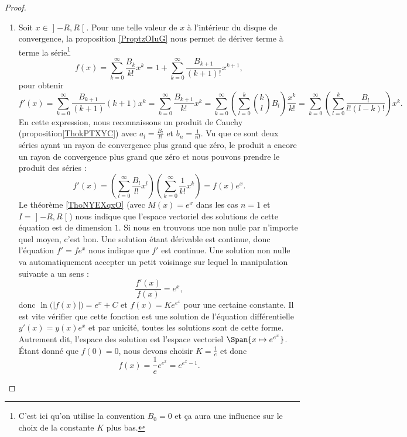 \begin{proof}
\begin{enumerate}
        \item

            Soit \( x\in\mathopen] -R , R \mathclose[\). Pour une telle valeur de \( x\) à l'intérieur du disque de convergence, la proposition \ref{ProptzOIuG} nous permet de dériver terme à terme la série\footnote{C'est ici qu'on utilise la convention \( B_0=0\) et ça aura une influence sur le choix de la constante \( K\) plus bas.}
                \begin{equation}
                    f(x)=\sum_{k=0}^{\infty}\frac{ B_k }{ k! }x^k=1+\sum_{k=0}^{\infty}\frac{ B_{k+1} }{ (k+1)! }x^{k+1},
                \end{equation}
                pour obtenir
                \begin{equation}
                    f'(x)=\sum_{k=0}^{\infty}\frac{ B_{k+1} }{ (k+1) }(k+1)x^k=\sum_{k=0}^{\infty}\frac{ B_{k+1} }{ k! }x^k=\sum_{k=0}^{\infty}\left( \sum_{l=0}^k{k\choose l}B_l \right)\frac{ x^k }{ k! }=\sum_{k=0}^{\infty}\left( \sum_{l=0}^k\frac{ B_l }{ l!(l-k)! } \right)x^k.
                \end{equation}
                En cette expression, nous reconnaissons un produit de Cauchy (proposition\ref{ThokPTXYC}) avec \( a_l=\frac{ B_l }{ l! }\) et \( b_n=\frac{ 1 }{ n! }\). Vu que ce sont deux séries ayant un rayon de convergence plus grand que zéro, le produit a encore un rayon de convergence plus grand que zéro et nous pouvons prendre le produit des séries :
                \begin{equation}
                    f'(x)=\left( \sum_{l=0}^{\infty}\frac{ B_l }{ l! }x^l \right)\left( \sum_{k=0}^{\infty}\frac{1}{ k! }x^k \right)=f(x) e^{x}.
                \end{equation}
                Le théorème \ref{ThoNYEXqxO} (avec \( M(x)=e^x\) dans les cas \( n=1\) et \( I=\mathopen] -R , R \mathclose[\)) nous indique que l'espace vectoriel des solutions de cette équation est de dimension \( 1\). Si nous en trouvons une non nulle par n'importe quel moyen, c'est bon. Une solution étant dérivable est continue, donc l'équation \( f'=f e^{x}\) nous indique que \( f'\) est continue. Une solution non nulle va automatiquement accepter un petit voisinage sur lequel la manipulation suivante a un sens :
                    \begin{equation}
                        \frac{ f'(x) }{ f(x) }= e^{x},
                    \end{equation}
                    donc \( \ln\big( | f(x) | \big)= e^{x}+C\) et \( f(x)=K e^{ e^{x}}\) pour une certaine constante. Il est vite vérifier que cette fonction est une solution de l'équation différentielle \( y'(x)=y(x) e^{x}\) et par unicité, toutes les solutions sont de cette forme. Autrement dit, l'espace des solution est l'espace vectoriel \( \Span\{ x\mapsto e^{e^x} \}\). Étant donné que \( f(0)=0\), nous devons choisir \( K=\frac{1}{ e }\) et donc 
                    \begin{equation}
                        f(x)=\frac{1}{ e } e^{e^x}= e^{e^x-1}.
                    \end{equation}


\end{enumerate}
\end{proof}

